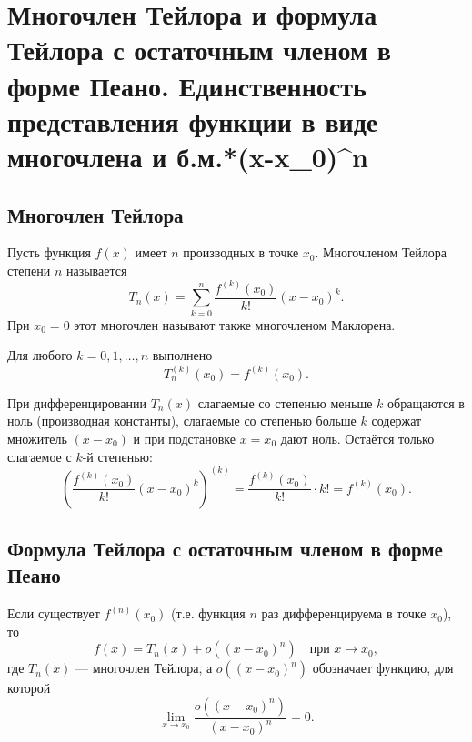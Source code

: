 \section{Многочлен Тейлора и формула Тейлора с остаточным членом в форме Пеано. Единственность представления функции в виде многочлена и б.м.*(x-x\_0)\textasciicircum n}

\subsection{Многочлен Тейлора}

\begin{definition}
    Пусть функция \(f(x)\) имеет \(n\) производных в точке \(x_0\). 
    Многочленом Тейлора степени \(n\) называется
    \[
    T_n(x) = \sum_{k=0}^n \frac{f^{(k)}(x_0)}{k!} (x - x_0)^k.
    \]
    При \(x_0 = 0\) этот многочлен называют также многочленом Маклорена.
\end{definition}

\begin{theorem}
    Для любого \(k = 0, 1, \dots, n\) выполнено
    \[
    T_n^{(k)}(x_0) = f^{(k)}(x_0).
    \]
\end{theorem}

\begin{Proof}
    При дифференцировании \(T_n(x)\) слагаемые со степенью меньше \(k\) обращаются в ноль (производная константы), 
    слагаемые со степенью больше \(k\) содержат множитель \((x - x_0)\) и при подстановке \(x = x_0\) дают ноль. 
    Остаётся только слагаемое с \(k\)-й степенью:
    \[
    \left( \frac{f^{(k)}(x_0)}{k!} (x - x_0)^k \right)^{(k)} = \frac{f^{(k)}(x_0)}{k!} \cdot k! = f^{(k)}(x_0).
    \]
\end{Proof}

\subsection{Формула Тейлора с остаточным членом в форме Пеано}

\begin{theorem}
    Если существует \(f^{(n)}(x_0)\) (т.е. функция \(n\) раз дифференцируема в точке \(x_0\)), то
    \[
    f(x) = T_n(x) + o((x - x_0)^n) \quad \text{при } x \to x_0,
    \]
    где \(T_n(x)\) — многочлен Тейлора, а \(o((x - x_0)^n)\) обозначает функцию, для которой
    \[
    \lim_{x \to x_0} \frac{o((x - x_0)^n)}{(x - x_0)^n} = 0.
    \]
\end{theorem}


